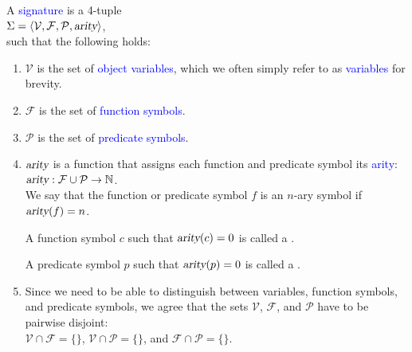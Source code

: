\begin{Definition}[Signature]
  A \textcolor{blue}{signature} is a 4-tuple \\[0.2cm]
  \hspace*{1.3cm} $\Sigma = \langle \mathcal{V}, \mathcal{F}, \mathcal{P}, \textsl{arity} \rangle$, \\[0.2cm]
  such that the following holds:
  \begin{enumerate}
  \item $\mathcal{V}$ is the set of \textcolor{blue}{object variables}, which we often simply refer to as
        \textcolor{blue}{variables} for brevity.
  \item $\mathcal{F}$ is the set of \textcolor{blue}{function symbols}.
  \item $\mathcal{P}$ is the set of \textcolor{blue}{predicate symbols}.
  \item $\textsl{arity}$ is a function that assigns each function and predicate symbol its
        \textcolor{blue}{arity}: \\[0.2cm]
        \hspace*{1.3cm} $\textsl{arity}: \mathcal{F} \cup \mathcal{P} \rightarrow \mathbb{N}$. \\[0.2cm]
        We say that the function or predicate symbol $f$ is an
        $n$-ary symbol if $\textsl{arity}(f) = n$.
        
        A function symbol $c$ such that $\textsl{arity}(c) = 0$ is called a . 
        
        A predicate symbol $p$ such that $\textsl{arity}(p) = 0$ is called a .
  \item Since we need to be able to distinguish between variables, function symbols, and predicate symbols,
        we agree that the sets $\mathcal{V}$, $\mathcal{F}$, and $\mathcal{P}$ have to be pairwise disjoint: \\[0.2cm] 
        \hspace*{1.3cm} $\mathcal{V} \cap \mathcal{F} = \{\}$, \quad
                        $\mathcal{V} \cap \mathcal{P} = \{\}$, \quad and \quad
                        $\mathcal{F} \cap \mathcal{P} = \{\}$. \eox
  \end{enumerate}
\end{Definition}

